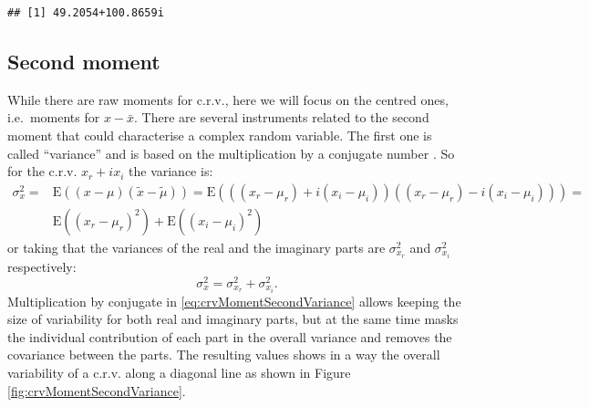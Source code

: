 \documentclass[
]{book}
\begin{document}
\begin{verbatim}
## [1] 49.2054+100.8659i
\end{verbatim}

\hypertarget{crvSecondMoment}{%
\subsection{Second moment}\label{crvSecondMoment}}

While there are raw moments for c.r.v., here we will focus on the centred ones, i.e.~moments for \(x-\bar{x}\). There are several instruments related to the second moment that could characterise a complex random variable. The first one is called ``variance'' and is based on the multiplication by a conjugate number \citep{reference}. So for the c.r.v. \(x_r + i x_i\) the variance is:
\begin{equation}
    \begin{aligned}
    \sigma_x^2 = & \mathrm{E}((x-\mu) (\tilde{x}-\tilde{\mu})) = \mathrm{E}\left(((x_r-\mu_{r}) + i (x_i-\mu_{i}))((x_r-\mu_{r}) - i (x_i-\mu_{i}))\right) = \\
                & \mathrm{E}((x_r-\mu_{r})^2) +  \mathrm{E}((x_i-\mu_{i})^2)
    \end{aligned}
    \label{eq:crvMomentSecondVariance}
\end{equation}
or taking that the variances of the real and the imaginary parts are \(\sigma_{x_r}^2\) and \(\sigma_{x_i}^2\) respectively:
\begin{equation}
    \sigma_x^2 = \sigma_{x_r}^2 + \sigma_{x_i}^2.
    \label{eq:crvMomentSecondVarianceShort}
\end{equation}
Multiplication by conjugate in \eqref{eq:crvMomentSecondVariance} allows keeping the size of variability for both real and imaginary parts, but at the same time masks the individual contribution of each part in the overall variance and removes the covariance between the parts. The resulting values shows in a way the overall variability of a c.r.v. along a diagonal line as shown in Figure \ref{fig:crvMomentSecondVariance}.
\end{document}
